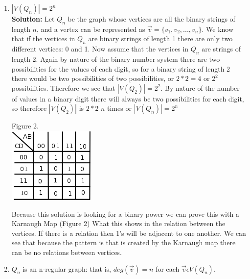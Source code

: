 \documentclass[10pt,a4paper]{report}
\begin{document}
		\begin{enumerate}
			\item $|V(Q_n)| = 2^n$\\
			\textbf{Solution: }Let $Q_{n}$ be the graph whose vertices are all the binary strings of length $n$, and a vertex can be represented as $\vec{v} = \{v_{1}, v_{2}, ..., v_{n}\}$.  We know that if the vertices in $Q_{n}$ are binary strings of length 1 there are only two different vertices: 0 and 1.  Now assume that the vertices in $Q_{n}$ are strings of length 2.  Again by nature of the binary number system there are two possibilities for the values of each digit, so for a binary string of length 2 there would be two possibilities of two possibilities, or $2*2=4$ or $2^{2}$ possibilities.  Therefore we see that $|V(Q_{2})| = 2^{2}$. By nature of the number of values in a binary digit there will always be two possibilities for each digit, so therefore $|V(Q_{2})|$ is $2 * 2$ $n$ times or $|V(Q_{n})|=2^{n}$
			
			\begin{center}
				Figure 2.\\
				\includegraphics[scale=.5]{2_1.png}
			\end{center}
			
			Because this solution is looking for a binary power we can prove this with a Karnaugh Map (Figure 2) What this shows in the relation between the vertices.  If there is a relation then 1's will be adjacent to one another.  We can see that because the pattern is that is created by the Karnaugh map there can be no relations between vertices.
			\item $Q_n$ is an n-regular graph: that is, $deg (\vec{v}) = n $ for each $\vec{v} \epsilon V(Q_n)$.
			

\end{enumerate}
\end{document}
